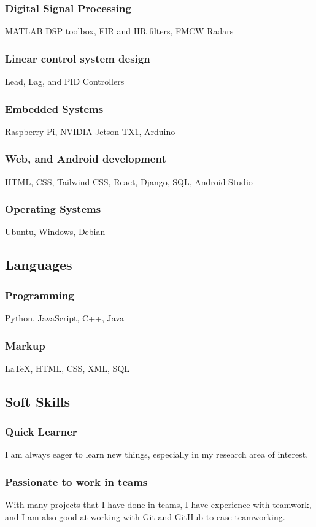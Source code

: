 \documentclass[a4paper]{article}
\begin{document}
        \subsubsection{Digital Signal Processing}
        MATLAB DSP toolbox, FIR and IIR filters, FMCW Radars
        \subsubsection{Linear control system design}
        Lead, Lag, and PID Controllers
        \subsubsection{Embedded Systems}
        Raspberry Pi, NVIDIA Jetson TX1, Arduino
        \subsubsection{Web, and Android  development}
        HTML, CSS, Tailwind CSS, React, Django, SQL, Android Studio
        \subsubsection{Operating Systems}
        Ubuntu, Windows, Debian
        \subsection{Languages}
        \subsubsection{Programming}
        Python, JavaScript, C++, Java
        \subsubsection{Markup}
        {\LaTeX}, HTML, CSS, XML, SQL
        \subsection{Soft Skills}
        \subsubsection{Quick Learner}
        I am always eager to learn new things, especially in my research area of interest.
        \subsubsection{Passionate to work in teams}
        With many projects that I have done in teams, I have experience with teamwork, and I am also good at working with Git and GitHub to ease teamworking.
\end{document}
